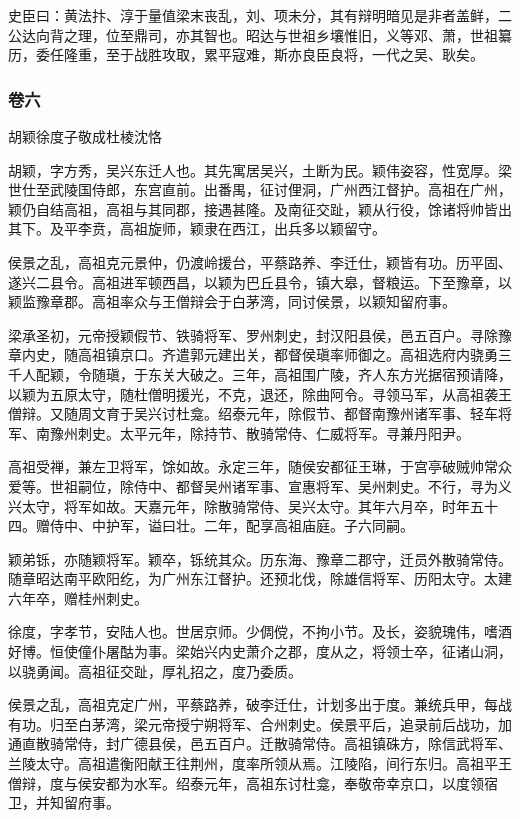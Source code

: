 \documentclass[]{article}
\begin{document}
史臣曰：黄法抃、淳于量值梁末丧乱，刘、项未分，其有辩明暗见是非者盖鲜，二公达向背之理，位至鼎司，亦其智也。昭达与世祖乡壤惟旧，义等邓、萧，世祖纂历，委任隆重，至于战胜攻取，累平寇难，斯亦良臣良将，一代之吴、耿矣。

\hypertarget{header-n4421}{%
\subsubsection{卷六}\label{header-n4421}}

胡颖徐度子敬成杜棱沈恪

胡颖，字方秀，吴兴东迁人也。其先寓居吴兴，土断为民。颖伟姿容，性宽厚。梁世仕至武陵国侍郎，东宫直前。出番禺，征讨俚洞，广州西江督护。高祖在广州，颖仍自结高祖，高祖与其同郡，接遇甚隆。及南征交趾，颖从行役，馀诸将帅皆出其下。及平李贲，高祖旋师，颖隶在西江，出兵多以颖留守。

侯景之乱，高祖克元景仲，仍渡岭援台，平蔡路养、李迁仕，颖皆有功。历平固、遂兴二县令。高祖进军顿西昌，以颖为巴丘县令，镇大皋，督粮运。下至豫章，以颖监豫章郡。高祖率众与王僧辩会于白茅湾，同讨侯景，以颖知留府事。

梁承圣初，元帝授颖假节、铁骑将军、罗州刺史，封汉阳县侯，邑五百户。寻除豫章内史，随高祖镇京口。齐遣郭元建出关，都督侯瑱率师御之。高祖选府内骁勇三千人配颖，令随瑱，于东关大破之。三年，高祖围广陵，齐人东方光据宿预请降，以颖为五原太守，随杜僧明援光，不克，退还，除曲阿令。寻领马军，从高祖袭王僧辩。又随周文育于吴兴讨杜龛。绍泰元年，除假节、都督南豫州诸军事、轻车将军、南豫州刺史。太平元年，除持节、散骑常侍、仁威将军。寻兼丹阳尹。

高祖受禅，兼左卫将军，馀如故。永定三年，随侯安都征王琳，于宫亭破贼帅常众爱等。世祖嗣位，除侍中、都督吴州诸军事、宣惠将军、吴州刺史。不行，寻为义兴太守，将军如故。天嘉元年，除散骑常侍、吴兴太守。其年六月卒，时年五十四。赠侍中、中护军，谥曰壮。二年，配享高祖庙庭。子六同嗣。

颖弟铄，亦随颖将军。颖卒，铄统其众。历东海、豫章二郡守，迁员外散骑常侍。随章昭达南平欧阳纥，为广州东江督护。还预北伐，除雄信将军、历阳太守。太建六年卒，赠桂州刺史。

徐度，字孝节，安陆人也。世居京师。少倜傥，不拘小节。及长，姿貌瑰伟，嗜酒好博。恒使僮仆屠酤为事。梁始兴内史萧介之郡，度从之，将领士卒，征诸山洞，以骁勇闻。高祖征交趾，厚礼招之，度乃委质。

侯景之乱，高祖克定广州，平蔡路养，破李迁仕，计划多出于度。兼统兵甲，每战有功。归至白茅湾，梁元帝授宁朔将军、合州刺史。侯景平后，追录前后战功，加通直散骑常侍，封广德县侯，邑五百户。迁散骑常侍。高祖镇硃方，除信武将军、兰陵太守。高祖遣衡阳献王往荆州，度率所领从焉。江陵陷，间行东归。高祖平王僧辩，度与侯安都为水军。绍泰元年，高祖东讨杜龛，奉敬帝幸京口，以度领宿卫，并知留府事。
\end{document}
